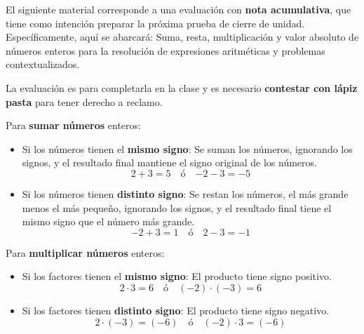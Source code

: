 \documentclass{prueba}
\begin{document}

El siguiente material corresponde a una evaluación con {\bfseries nota acumulativa}, que 
tiene como intención preparar la próxima prueba de cierre de unidad. Específicamente,
aquí se abarcará: Suma, resta, multiplicación y valor absoluto de números enteros 
para la resolución de expresiones aritméticas y problemas contextualizados.    

La evaluación es para completarla en la clase y es necesario {\bfseries contestar con lápiz pasta}
para tener derecho a reclamo.


Para {\bfseries sumar números} enteros:
\begin{itemize}
    \item Si los números tienen el {\bfseries mismo signo}: Se suman los números, %
    ignorando los signos, y el resultado final mantiene el signo original de los números. %
    \begin{equation*}
        \boxed{2+3=5} \quad \text{ó}  \quad \boxed{-2-3=-5}
    \end{equation*}
    \item Si los números tienen {\bfseries distinto signo}: Se restan los números, %
    el más grande menos el más pequeño, ignorando los signos, y el resultado final tiene %
    el mismo signo que el número más grande. 
    \begin{equation*}
        \boxed{-2+3=1} \quad\text{ó}\quad \boxed{2-3=-1}
    \end{equation*}
\end{itemize}

Para {\bfseries multiplicar números} enteros:
\begin{itemize}
    \item Si los factores tienen el {\bfseries mismo signo}: El producto tiene signo %
    positivo.
    \begin{equation*}
        \boxed{2 \cdot 3=6} \quad\text{ó}\quad \boxed{(-2)\cdot(-3)=6}
    \end{equation*}
    \item Si los factores tienen {\bfseries distinto signo}: El producto tiene signo %
    negativo.
    \begin{equation*}
        \boxed{2 \cdot (-3)=(-6)} \quad\text{ó}\quad \boxed{(-2) \cdot 3 = (-6)}
    \end{equation*}
\end{itemize}
\end{document}
